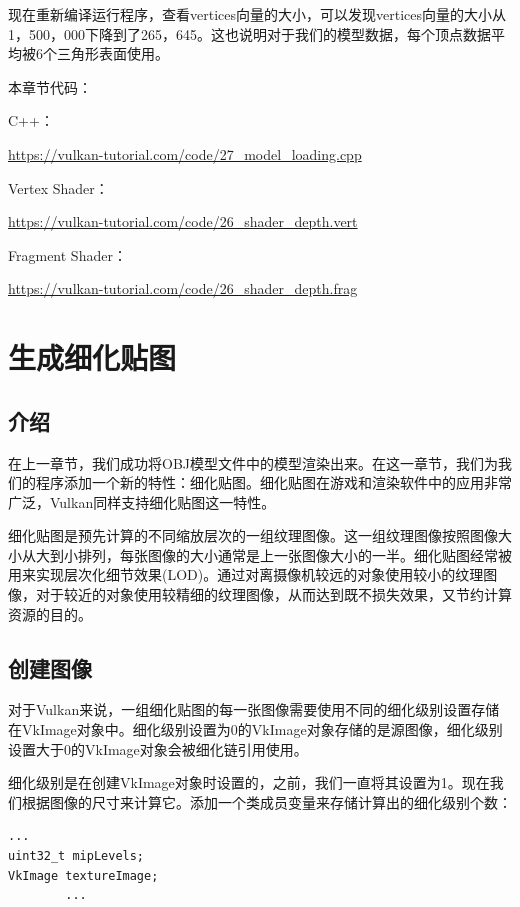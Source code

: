 \documentclass{ctexart}
\begin{document}
现在重新编译运行程序，查看vertices向量的大小，可以发现vertices向量的大小从1，500，000下降到了265，645。这也说明对于我们的模型数据，每个顶点数据平均被6个三角形表面使用。

本章节代码：

C++：

\url{https://vulkan-tutorial.com/code/27_model_loading.cpp}

Vertex Shader：

\url{https://vulkan-tutorial.com/code/26_shader_depth.vert}

Fragment Shader：

\url{https://vulkan-tutorial.com/code/26_shader_depth.frag}

\newpage
\section{生成细化贴图}

\subsection{介绍}

在上一章节，我们成功将OBJ模型文件中的模型渲染出来。在这一章节，我们为我们的程序添加一个新的特性：细化贴图。细化贴图在游戏和渲染软件中的应用非常广泛，Vulkan同样支持细化贴图这一特性。

细化贴图是预先计算的不同缩放层次的一组纹理图像。这一组纹理图像按照图像大小从大到小排列，每张图像的大小通常是上一张图像大小的一半。细化贴图经常被用来实现层次化细节效果(LOD)。通过对离摄像机较远的对象使用较小的纹理图像，对于较近的对象使用较精细的纹理图像，从而达到既不损失效果，又节约计算资源的目的。

\subsection{创建图像}

对于Vulkan来说，一组细化贴图的每一张图像需要使用不同的细化级别设置存储在VkImage对象中。细化级别设置为0的VkImage对象存储的是源图像，细化级别设置大于0的VkImage对象会被细化链引用使用。

细化级别是在创建VkImage对象时设置的，之前，我们一直将其设置为1。现在我们根据图像的尺寸来计算它。添加一个类成员变量来存储计算出的细化级别个数：

\begin{lstlisting}[language={[ANSI]C}]
		...
uint32_t mipLevels;
VkImage textureImage;
		...
\end{lstlisting}
\end{document}
